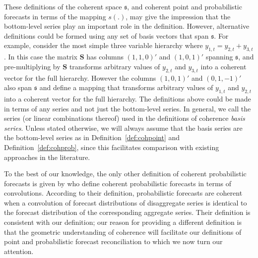 \documentclass[a4paper, 11pt]{article}
\theoremstyle{definition}
\begin{document}
These definitions of the coherent space $\mathfrak{s}$, and coherent point and probabilistic forecasts in terms of the mapping $s(.)$, may give the impression that the bottom-level series play an important role in the definition. However, alternative definitions could be formed using any set of basis vectors that span $\mathfrak{s}$. For example, consider the most simple three variable hierarchy where $y_{1,t}=y_{2,t}+y_{3,t}$. In this case the matrix $\bm{S}$ has columns $(1,1,0)'$ and $(1,0,1)'$ spanning $\mathfrak{s}$, and pre-multiplying by $\bm{S}$ transforms arbitrary values of $y_{2,t}$ and $y_{3,t}$ into a coherent vector for the full hierarchy. However the columns $(1,0,1)'$ and $(0,1,-1)'$ also span $\mathfrak{s}$ and define a mapping that transforms arbitrary values of $y_{1,t}$ and $y_{2,t}$ into a coherent vector for the full hierarchy. The definitions above could be made in terms of any series and not just the bottom-level series. In general, we call the series (or linear combinations thereof) used in the definitions of coherence \textit{basis series}. Unless stated otherwise, we will always assume that the basis series are the bottom-level series as in Definition~\ref{def:cohpoint} and Definition~\ref{def:cohprob}, since this facilitates comparison with existing approaches in the literature.


To the best of our knowledge, the only other definition of coherent probabilistic forecasts is given by \citet{BenTaieb2017} who define coherent probabilistic forecasts in terms of convolutions. According to their definition, probabilistic forecasts are coherent when a convolution of forecast distributions of disaggregate series is identical to the forecast distribution of the corresponding aggregate series. Their definition is consistent with our definition; our reason for providing a different definition is that the geometric understanding of coherence will facilitate our definitions of point and probabilistic forecast reconciliation to which we now turn our attention.
\end{document}
